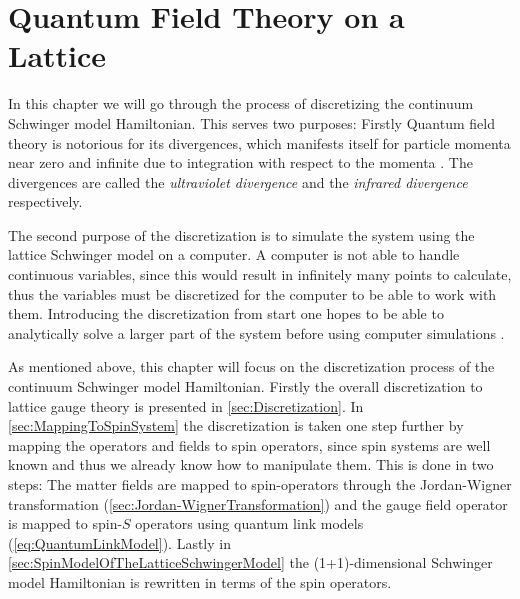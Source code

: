 \documentclass[../main.tex]{subfiles} %
\begin{document}
\chapter{Quantum Field Theory on a Lattice} \label{chap:LatticeQFT}

In this chapter we will go through the process of discretizing the continuum Schwinger model Hamiltonian. This serves two purposes: Firstly Quantum field theory is notorious for its divergences, which manifests itself for particle momenta near zero and infinite due to integration with respect to the momenta \cite{peskin_introToQFT_1995, panyella_masterThesis_2019}. The divergences are called the \emph{ultraviolet divergence} and the \emph{infrared divergence} respectively.


The second purpose of the discretization is to simulate the system using the lattice Schwinger model on a computer. A computer is not able to handle continuous variables, since this would result in infinitely many points to calculate, thus the variables must be discretized for the computer to be able to work with them. Introducing the discretization from start one hopes to be able to analytically solve a larger part of the system before using computer simulations \cite{panyella_masterThesis_2019}.

As mentioned above, this chapter will focus on the discretization process of the continuum Schwinger model Hamiltonian. Firstly the overall discretization to lattice gauge theory is presented in \cref{sec:Discretization}. In \cref{sec:MappingToSpinSystem} the discretization is taken one step further by mapping the operators and fields to spin operators, since spin systems are well known and thus we already know how to manipulate them. This is done in two steps: The matter fields are mapped to spin-\half operators through the Jordan-Wigner transformation (\cref{sec:Jordan-WignerTransformation}) and the gauge field operator is mapped to spin-$S$ operators using quantum link models (\cref{eq:QuantumLinkModel}). Lastly in \cref{sec:SpinModelOfTheLatticeSchwingerModel} the (1+1)-dimensional Schwinger model Hamiltonian is rewritten in terms of the spin operators.
\end{document}
